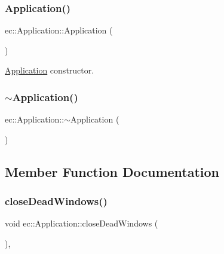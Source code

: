 \subsubsection{\texorpdfstring{Application()}{Application()}}
{\footnotesize\ttfamily ec\+::\+Application\+::\+Application (\begin{DoxyParamCaption}{ }\end{DoxyParamCaption})\hspace{0.3cm}{\ttfamily [explicit]}}



\mbox{\hyperlink{classec_1_1_application}{Application}} constructor. 

\mbox{\label{classec_1_1_application_abe00fd469062e9710bfda9f9d13765f3}} 
\subsubsection{\texorpdfstring{$\sim$\+Application()}{~Application()}}
{\footnotesize\ttfamily ec\+::\+Application\+::$\sim$\+Application (\begin{DoxyParamCaption}{ }\end{DoxyParamCaption})\hspace{0.3cm}{\ttfamily [default]}}



\subsection{Member Function Documentation}
\mbox{\label{classec_1_1_application_ad6a3915f4ea913bf392a03fbd3548d99}} 
\subsubsection{\texorpdfstring{close\+Dead\+Windows()}{closeDeadWindows()}}
{\footnotesize\ttfamily void ec\+::\+Application\+::close\+Dead\+Windows (\begin{DoxyParamCaption}{ }\end{DoxyParamCaption})\hspace{0.3cm}{\ttfamily [protected]}, {\ttfamily [virtual]}}



